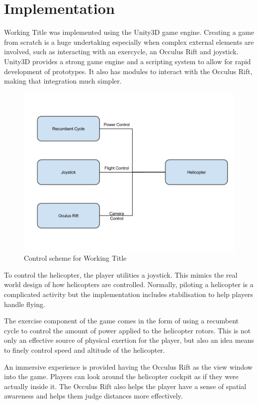\documentclass[a4paper, 11pt]{article}
\begin{document}
\section{Implementation}
\begin{multicols}{2}

Working Title was implemented using the Unity3D game engine. Creating a game from scratch is a huge undertaking especially when complex external elements are involved, such as interacting with an exercycle, an Occulus Rift and joystick. Unity3D provides a strong game engine and a scripting system to allow for rapid development of prototypes. It also has modules to interact with the Occulus Rift, making that integration much simpler.

\end{multicols}
\begin{figure}[H]
\centering
\includegraphics[scale=0.3]{diagram-1.png}
\caption{Control scheme for Working Title}
\end{figure}
\begin{multicols}{2}

To control the helicopter, the player utilities a joystick. This mimics the real world design of how helicopters are controlled. Normally, piloting a helicopter is a complicated activity but the implementation includes stabilisation to help players handle flying. 

The exercise component of the game comes in the form of using a recumbent cycle to control the amount of power applied to the helicopter rotors. This is not only an effective source of physical exertion for the player, but also an idea means to finely control speed and altitude of the helicopter.

An immersive experience is provided having the Occulus Rift as the view window into the game. Players can look around the helicopter cockpit as if they were actually inside it. The Occulus Rift also helps the player have a sense of spatial awareness and helps them judge distances more effectively.



\end{multicols}
\end{document}
